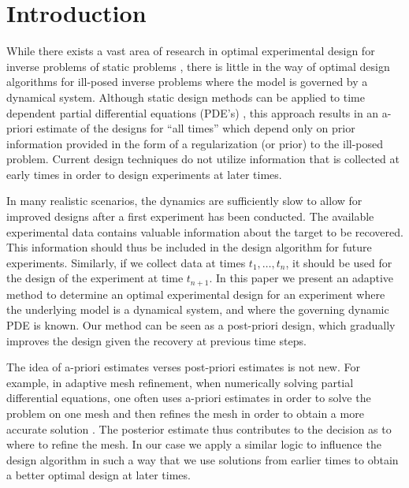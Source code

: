 \documentclass[final,leqno,onefignum,onetabnum]{siamltexmm}
\begin{document}
\section{Introduction}
While there exists a vast area of research in optimal experimental design for  inverse problems  of static problems \cite{Haber2011,Haber2008,Haber2010,Bardow2008,Chaloner1995,Curtis1999,Atkinson1992,Pukelsheim1993a,Ajo-Franklin2009,Fedorov1972}, there is little in the way of optimal design algorithms for ill-posed inverse problems where the model is governed by a dynamical system. Although static design methods can be applied to time dependent partial differential equations (PDE's) \cite{Alexanderian2014,Haber2011}, this approach results in an a-priori estimate of the designs for ``all times''  which depend only on prior information provided in the form of a regularization (or prior) to the ill-posed problem.  Current design techniques do not utilize information that is collected at early times in order
 to design experiments at later times.
 
 In many realistic scenarios, the dynamics are sufficiently slow to allow for improved designs after a first experiment has been conducted. The available experimental data contains valuable information about the target to be recovered. This information should thus be included in the design algorithm for future experiments. 
 Similarly, if we  collect data at times $t_{1},\ldots , t_{n}$, it should be used for the design of the experiment at time $t_{n+1}$.
 In this paper we present an adaptive method to determine an optimal experimental design for an experiment where the underlying model is a dynamical system, and  where the governing dynamic PDE is known.
 Our method can be seen as a post-priori design, which gradually improves the design given the recovery at previous time steps. 
  
 The idea of a-priori estimates verses post-priori  estimates is not new. For example, in adaptive mesh refinement, when numerically 
solving partial differential
equations, one often uses a-priori estimates in order to solve the problem on one mesh 
and then refines the mesh in order to obtain a more accurate solution \cite{MultiGrid}. The posterior estimate thus contributes to the decision as to where to refine the mesh. In our case we apply a similar logic to influence the design algorithm in such a way that we use solutions from earlier times to obtain a better optimal design at later times. 
\end{document}
